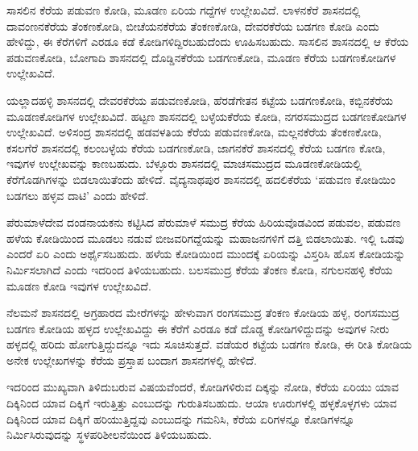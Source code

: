 ಸಾಸಲಿನ ಕೆರೆಯ ಪಡುವಣ ಕೋಡಿ, ಮೂಡಣ ಏರಿಯ ಗದ್ದೆಗಳ ಉಲ್ಲೇಖವಿದೆ. ಲಾಳನಕೆರೆ ಶಾಸನದಲ್ಲಿ ದಾವಂಣನಕೆರೆಯ ತೆಂಕಣಕೋಡಿ, ಬೀಚೆಯನಕೆರೆಯ ತೆಂಕಣಕೋಡಿ, ದೇವರಕೆರೆಯ ಬಡಗಣ ಕೋಡಿ ಎಂದು ಹೇಳಿದ್ದು, ಈ ಕೆರೆಗಳಿಗೆ ಎರಡೂ ಕಡೆ ಕೋಡಿಗಳಿದ್ದಿರಬಹುದೆಂದು ಊಹಿಸಬಹುದು. ಸಾಸಲಿನ ಶಾಸನದಲ್ಲಿ ಆ ಕೆರೆಯ ಪಡುವಣಕೋಡಿ, ಬೋಗಾದಿ ಶಾಸನದಲ್ಲಿ ದೊಡ್ಡಿನಕೆರೆಯ ಬಡಗಣಕೋಡಿ, ಮೂಡಣ ಕೆರೆಯ ಬಡಗಣಕೋಡಿಗಳ ಉಲ್ಲೇಖವಿದೆ.

ಯಲ್ಲಾದಹಳ್ಳಿ ಶಾಸನದಲ್ಲಿ ದೇವರಕೆರೆಯ ಪಡುವಣಕೋಡಿ, ಹೆರಡೆಗೇತನ ಕಟ್ಟೆಯ ಬಡಗಣಕೋಡಿ, ಕಬ್ಬಿನಕೆರೆಯ ಮೂಡಣಕೋಡಿಗಳ ಉಲ್ಲೇಖವಿದೆ. ಹಟ್ಟಣ ಶಾಸನದಲ್ಲಿ ಬಳ್ಳೆಯಕೆರೆಯ ಕೋಡಿ, ನಗರಸಮುದ್ರದ ಬಡಗಣಕೋಡಿಗಳ ಉಲ್ಲೇಖವಿದೆ. ಅಳಿಸಂದ್ರ ಶಾಸನದಲ್ಲಿ ಹಡವಳತಿಯ ಕೆರೆಯ ಪಡುವಣಕೋಡಿ, ಮಲ್ಲನಕೆರೆಯ ತೆಂಕಣಕೋಡಿ, ಕಸಲಗೆರೆ ಶಾಸನದಲ್ಲಿ ಕಲಂಬಳ್ಳೆಯ ಕೆರೆಯ ಬಡಗಣಕೋಡಿ, ಜಾಗನಕೆರೆ ಶಾಸನದಲ್ಲಿ ಕೆರೆಯ ಬಡಗಣ ಕೋಡಿ, ಇವುಗಳ ಉಲ್ಲೇಖವನ್ನು ಕಾಣಬಹುದು. ಬೆಳ್ಳೂರು ಶಾಸನದಲ್ಲಿ ಮಾಚಸಮುದ್ರದ ಮೂಡಣಕೋಡಿಯಲ್ಲಿ ಕೆರೆಗೊಡಗಿಗಳನ್ನು ಬಿಡಲಾಯಿತೆಂದು ಹೇಳಿದೆ. ವೈದ್ಯನಾಥಪುರ ಶಾಸನದಲ್ಲಿ ಹದಲಿಕೆರೆಯ ‘ಪಡುವಣ ಕೋಡಿಯಿಂ ಬಡಗಲು ಹಳ್ಳವ ದಾಟಿ’ ಎಂದು ಹೇಳಿದೆ.

ಪೆರುಮಾಳೆದೇವ ದಂಡನಾಯಕನು ಕಟ್ಟಿಸಿದ ಪೆರುಮಾಳೆ ಸಮುದ್ರ ಕೆರೆಯ ಹಿರಿಯವೊಡವಿಂದ ಪಡುವಲ, ಪಡುವಣ ಹಳೆಯ ಕೋಡಿಯಿಂದ ಮೂಡಲು ನಡುವೆ ಬೀಜವರಿಗದ್ದೆಯನ್ನು ಮಹಾಜನಗಳಿಗೆ ದತ್ತಿ ಬಿಡಲಾಯಿತು. ಇಲ್ಲಿ ಒಡವು ಎಂದರೆ ಏರಿ ಎಂದು ಅರ್ಥೈಸಬಹುದು. ಹಳೆಯ ಕೋಡಿಯಿಂದ ಮುಂದಕ್ಕೆ ಏರಿಯನ್ನು ವಿಸ್ತರಿಸಿ ಹೊಸ ಕೋಡಿಯನ್ನು ನಿರ್ಮಿಸಲಾಗಿದೆ ಎಂದು ಇದರಿಂದ ತಿಳಿಯಬಹುದು. ಬಲಸಮುದ್ರ ಕೆರೆಯ ತೆಂಕಣ ಕೋಡಿ, ನಗುಲನಹಳ್ಳಿ ಕೆರೆಯ ಮೂಡಣ ಕೋಡಿ ಇವುಗಳ ಉಲ್ಲೇಖವಿದೆ.

ನೆಲಮನೆ ಶಾಸನದಲ್ಲಿ ಅಗ್ರಹಾರದ ಮೇರೆಗಳನ್ನು ಹೇಳುವಾಗ ರಂಗಸಮುದ್ರ ತೆಂಕಣ ಕೋಡಿಯ ಹಳ್ಳ, ರಂಗಸಮುದ್ರ ಬಡಗಣ ಕೋಡಿಯ ಹಳ್ಳದ ಉಲ್ಲೇಖವಿದ್ದು ಈ ಕೆರೆಗೆ ಎರಡೂ ಕಡೆ ದೊಡ್ಡ ಕೋಡಿಗಳಿದ್ದುದನ್ನು ಅವುಗಳ ನೀರು ಹಳ್ಳದಲ್ಲಿ ಹರಿದು ಹೋಗುತ್ತಿದ್ದುದನ್ನೂ ಇದು ಸೂಚಿಸುತ್ತದೆ. ವಡೆಯರ ಕಟ್ಟೆಯ ಬಡಗಣ ಕೋಡಿ, ಈ ರೀತಿ ಕೋಡಿಯ ಅನೇಕ ಉಲ್ಲೇಖಗಳನ್ನು ಕೆರೆಯ ಪ್ರಸ್ತಾಪ ಬಂದಾಗ ಶಾಸನಗಳಲ್ಲಿ ಹೇಳಿದೆ.

ಇದರಿಂದ ಮುಖ್ಯವಾಗಿ ತಿಳಿದುಬರುವ ವಿಷಯವೆಂದರೆ, ಕೋಡಿಗಳಿರುವ ದಿಕ್ಕನ್ನು ನೋಡಿ, ಕೆರೆಯ ಏರಿಯು ಯಾವ ದಿಕ್ಕಿನಿಂದ ಯಾವ ದಿಕ್ಕಿಗೆ ಇರುತ್ತಿತ್ತು ಎಂಬುದನ್ನು ಗುರುತಿಸಬಹುದು. ಆಯಾ ಊರುಗಳಲ್ಲಿ ಹಳ್ಳಕೊಳ್ಳಗಳು ಯಾವ ದಿಕ್ಕಿನಿಂದ ಯಾವ ದಿಕ್ಕಿಗೆ ಹರಿಯುತ್ತಿದ್ದವು ಎಂಬುದನ್ನು ಗಮನಿಸಿ, ಕೆರೆಯ ಏರಿಗಳನ್ನೂ ಕೋಡಿಗಳನ್ನೂ ನಿರ್ಮಿಸಿರುವುದನ್ನು ಸ್ಥಳಪರಿಶೀಲನೆಯಿಂದ ತಿಳಿಯಬಹುದು.


